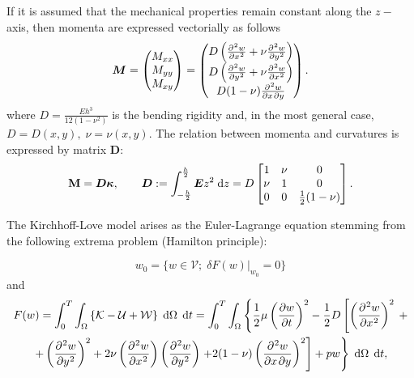 \documentclass[preprint,12pt]{elsarticle}
\newcommand{\matr}[1]{\bm{#1}}
\begin{document}
	If it is assumed that the mechanical properties remain constant along the $z-$axis, then momenta are expressed vectorially as follows 
	\begin{equation}
	\bm{M}=
	\begin{pmatrix}
	M_{xx} \\
	M_{yy} \\
	M_{xy} \\
	\end{pmatrix} = 
	\begin{pmatrix}
	D\left(\diffp[2]{w}{x} + \nu \diffp[2]{w}{y}\right)\\
	D\left(\diffp[2]{w}{y} + \nu \diffp[2]{w}{x}\right)\\
	D (1 - \nu) \diffp{w}{x,y} \\
	\end{pmatrix}.
	\end{equation}
	where  $D = \frac{E h^3}{12 (1 - \nu^2)}$ is the bending rigidity and, in the most general case, $D = D(x,y), \; \nu = \nu(x,y)$. The relation between momenta and curvatures is expressed by matrix $\bm{D}$:
	\begin{equation}
	\mathbf{M} = \matr{D} \bm{\kappa}, \qquad 
	\matr{D} := 
	\int_{-\frac{h}{2} }^{\frac{h}{2}}
	\bm{E} z^2 \d{z} = D 
	\begin{bmatrix}
	1 & \nu & 0 \\ 
	\nu & 1 & 0 \\
	0    & 0 & \frac{1}{2} (1 - \nu)
	\end{bmatrix}.
	\end{equation}
	
	The Kirchhoff-Love model arises as the Euler-Lagrange equation stemming from the following extrema problem (Hamilton principle):
	
	\begin{equation*} 
	w_0 = \{w \in \mathcal V; \; \left.\delta F(w) \right|_{w_0} = 0\}
	\end{equation*}
	and
	\begin{multline*}
	F(w) = \int_0^T \int_\Omega \left\{\mathcal{K} - \mathcal{U} + \mathcal{W} \right\} \d{\Omega} \, \d{t} = \int_0^T \int_\Omega \left\{\frac{1}{2} \mu \left(\diffp{w}{t}\right)^2 - \frac{1}{2} D \left[ \left(\diffp[2]{w}{x}\right)^2 \right. \right. + \\
	\left. + \left(\diffp[2]{w}{y}\right)^2 + 2\nu
	\left(\diffp[2]{w}{x}\right) \left(\diffp[2]{w}{y}\right)  \left. + 2 (1 - \nu) \left(\diffp{w}{x,y} \right)^2 \right] + p w \right\} \d{\Omega} \, \d{t},
	\end{multline*}
	
\end{document}
